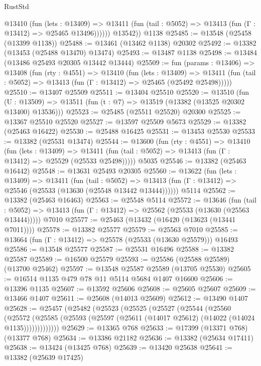 \begin{lexlean}{RustStd}
\begin{coremodule}
            @13410
              (fun (lets : @13409) =>
              @13411 (fun (tail : @5052) => @13413 (fun (Γ : @13412) => @25465 @13496))))))
        @13542))
    @1138
@25485 := @13548 (@25458 (@13399 @1138))
@25488 := @13461 (@13462 @1138) @20302
@25492 := @13382 (@13453 (@25488 @13470) @13474)
@25493 := @13487 @1138
@25498 := @13484 (@13486 @25493 @20305 @13442 @13444)
@25509 := fun (params : @13406) =>
  @13408
    (fun (rty : @4551) =>
    @13410
      (fun (lets : @13409) =>
      @13411 (fun (tail : @5052) => @13413 (fun (Γ : @13412) => @25465 (@25492 @25498)))))
@25510 := @13407 @25509
@25511 := @13404 @25510
@25520 := @13510
    (fun (U : @13509) => @13511 (fun (t : @7) => @13519 (@13382 (@13525 @20302 @13400) @13536)))
@25523 := @25485 (@25511 @25520) @20300
@25525 := @13367 @25510 @25520
@25527 := @13597 @25509 @5673
@25529 := @13382 (@25463 @16422)
@25530 := @25488 @16425
@25531 := @13453 @25530
@25533 := @13382 (@25531 @13474)
@25544 := @13600
    (fun (rty : @4551) =>
    @13410
      (fun (lets : @13409) =>
      @13411 (fun (tail : @5052) => @13413 (fun (Γ : @13412) => @25529 (@25533 @25498)))))
    @5035
@25546 := @13382 (@25463 @16442)
@25548 := @13631 @25493 @20305
@25560 := @13622
    (fun (lets : @13409) =>
    @13411
      (fun (tail : @5052) =>
      @13413 (fun (Γ : @13412) => @25546 (@25533 (@13630 (@25548 @13442 @13444))))))
    @5114
@25562 := @13382 (@25463 @16463)
@25563 := @25548 @5114
@25572 := @13646
    (fun (tail : @5052) => @13413 (fun (Γ : @13412) => @25562 (@25533 (@13630 (@25563 @13444)))))
    @7010
@25577 := @25463 (@13432 (@16420 (@13623 (@13441 @7011))))
@25578 := @13382 @25577
@25579 := @25563 @7010
@25585 := @13664 (fun (Γ : @13412) => @25578 (@25533 (@13630 @25579))) @16493
@25586 := @13548 @25577
@25587 := @25531 @16496
@25588 := @13382 @25587
@25589 := @16500 @25579
@25593 := @25586 (@25588 @25589) (@13700 @25462)
@25597 := @13548 @25587 @25589 (@13705 @25530)
@25605 := @16514 @1135 @479 @78 @11 @5114 @5684 @1407 @16600
@25606 := @13396 @1135
@25607 := @13592 @25606
@25608 := @25605 @25607
@25609 := @13466 @1407
@25611 := @25608 (@14013 @25609)
@25612 := @13490 @1407
@25628 := @25457
    (@25482
      (@25523
        (@25525
          (@25527
            (@25544
              (@25560
                (@25572
                  (@25585 (@25593 (@25597 (@25611 (@14017 @25612) (@14022 (@14024 @1135)))))))))))))
@25629 := @13365 @768
@25633 := @17399 (@13371 @768) (@13377 @768)
@25634 := @13386 @21182
@25636 := @13382 (@25634 @17411)
@25638 := @13424 (@13425 @768)
@25639 := @13420 @25638
@25641 := @13382 (@25639 @17425)

\end{coremodule}
\end{lexlean}
